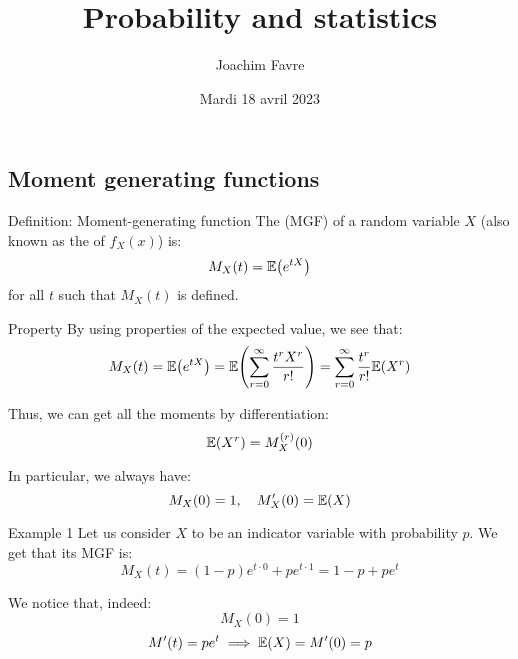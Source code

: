 \documentclass[a4paper]{article}
\title{Probability and statistics}
\author{Joachim Favre}
\date{Mardi 18 avril 2023}
\begin{document}
\maketitle


\subsection{Moment generating functions}

\begin{parag}{Definition: Moment-generating function}
    The  (MGF) of a random variable $X$ (also known as the  of $f_X\left(x\right)$) is: 
    \[M_X\left(t\right) = \exval\left(e^{tX}\right)\]
    for all $t$ such that $M_X\left(t\right)$ is defined.

    \begin{subparag}{Property}
        By using properties of the expected value, we see that: 
        \[M_X\left(t\right) = \exval\left(e^{tX}\right) = \exval\left(\sum_{r=0}^{\infty} \frac{t^r X^r}{r!}\right) = \sum_{r=0}^{\infty} \frac{t^r}{r!} \exval\left(X^r\right)\]
        
        Thus, we can get all the moments by differentiation: 
        \[\exval\left(X^r\right) = M_X^{\left(r\right)}\left(0\right)\]

        In particular, we always have: 
        \[M_X\left(0\right) = 1, \mathspace M_X'\left(0\right) = \exval\left(X\right)\]
    \end{subparag}
\end{parag}

\begin{parag}{Example 1}
    Let us consider $X$ to be an indicator variable with probability $p$. We get that its MGF is: 
    \[M_X\left(t\right) = \left(1-p\right)e^{t\cdot 0} + pe^{t\cdot 1} = 1 - p + pe^{t}\]
    
    We notice that, indeed: 
    \[M_X\left(0\right) = 1\]
    \[M'\left(t\right) = p e^t \implies \exval\left(X\right) = M'\left(0\right) = p\]
\end{parag}
\end{document}
